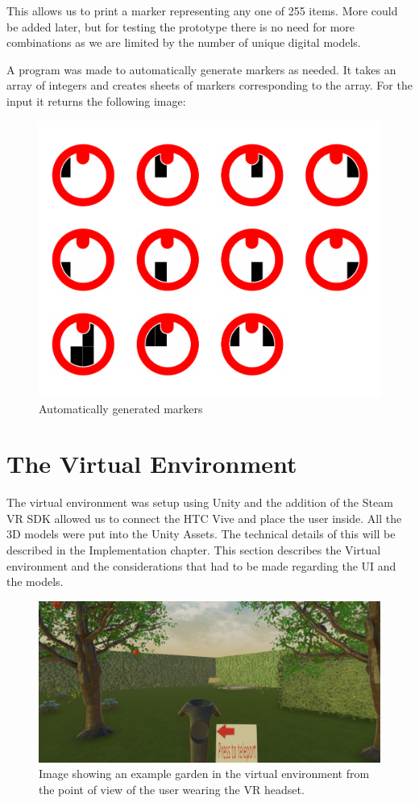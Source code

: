 This allows us to print a marker representing any one of 255 items. More could be added later, but for testing the prototype there is no need for more combinations as we are limited by the number of unique digital models.

A program was made to automatically generate markers as needed. It takes an array of integers and creates sheets of markers corresponding to the array. For the input  it returns the following image:

\begin{figure}[H]
	\centering
	\includegraphics[width=0.7\linewidth]{figure/Analysis/result}
	\caption{Automatically generated markers}
	\label{fig:result}
\end{figure}


\section{The Virtual Environment}
The virtual environment was setup using Unity and the addition of the Steam VR SDK allowed us to connect the HTC Vive and place the user inside. All the 3D models were put into the Unity Assets. The technical details of this will be described in the Implementation chapter. This section describes the Virtual environment and the considerations that had to be made regarding the UI and the models.

\begin{figure}[H]
	\centering
	\includegraphics[width=0.9\linewidth]{figure/Design/vrPov.png}
	\caption{Image showing an example garden in the virtual environment from the point of view of the user wearing the VR headset.}
	\label{fig:vrPov}
\end{figure}


